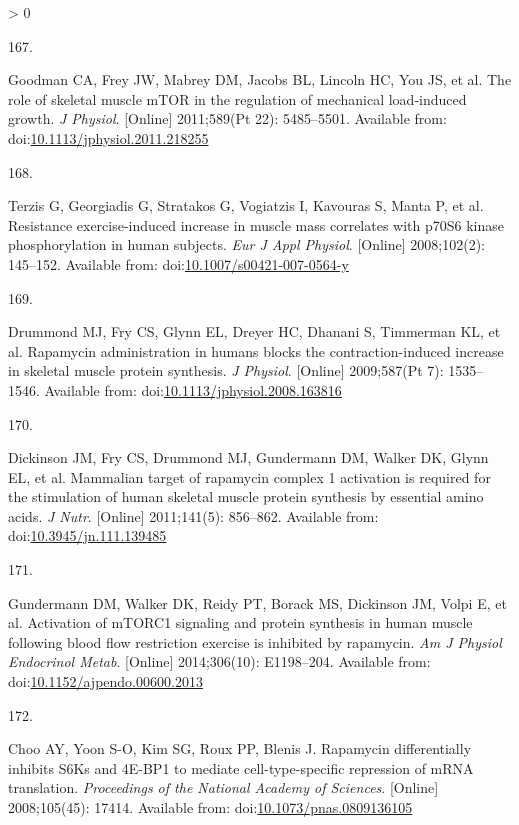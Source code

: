 \documentclass[twoside,10pt]{gihclass} %
\newlength{\cslhangindent}
\newlength{\csllabelwidth}
\newenvironment{CSLReferences}[3] %
 {%
  \setlength{\parindent}{0pt}
  \ifodd #1 \everypar{\setlength{\hangindent}{\cslhangindent}}\ignorespaces\fi
  \ifnum #2 > 0
  \setlength{\parskip}{#2\baselineskip}
  \fi
 }%
 {}
\newcommand{\CSLLeftMargin}[1]{\parbox[t]{\maxof{\widthof{#1}}{\csllabelwidth}}{#1}}
\newcommand{\CSLRightInline}[1]{\parbox[t]{\linewidth}{#1}}
\begin{document}
\begin{CSLReferences}{0}{0}
\leavevmode\hypertarget{ref-RN1072}{}%
\CSLLeftMargin{167. }
\CSLRightInline{Goodman CA, Frey JW, Mabrey DM, Jacobs BL, Lincoln HC, You JS, et al. The role of skeletal muscle mTOR in the regulation of mechanical load-induced growth. \emph{J Physiol}. {[}Online{]} 2011;589(Pt 22): 5485--5501. Available from: doi:\href{https://doi.org/10.1113/jphysiol.2011.218255}{10.1113/jphysiol.2011.218255}}

\leavevmode\hypertarget{ref-RN785}{}%
\CSLLeftMargin{168. }
\CSLRightInline{Terzis G, Georgiadis G, Stratakos G, Vogiatzis I, Kavouras S, Manta P, et al. Resistance exercise-induced increase in muscle mass correlates with p70S6 kinase phosphorylation in human subjects. \emph{Eur J Appl Physiol}. {[}Online{]} 2008;102(2): 145--152. Available from: doi:\href{https://doi.org/10.1007/s00421-007-0564-y}{10.1007/s00421-007-0564-y}}

\leavevmode\hypertarget{ref-RN780}{}%
\CSLLeftMargin{169. }
\CSLRightInline{Drummond MJ, Fry CS, Glynn EL, Dreyer HC, Dhanani S, Timmerman KL, et al. Rapamycin administration in humans blocks the contraction-induced increase in skeletal muscle protein synthesis. \emph{J Physiol}. {[}Online{]} 2009;587(Pt 7): 1535--1546. Available from: doi:\href{https://doi.org/10.1113/jphysiol.2008.163816}{10.1113/jphysiol.2008.163816}}

\leavevmode\hypertarget{ref-RN781}{}%
\CSLLeftMargin{170. }
\CSLRightInline{Dickinson JM, Fry CS, Drummond MJ, Gundermann DM, Walker DK, Glynn EL, et al. Mammalian target of rapamycin complex 1 activation is required for the stimulation of human skeletal muscle protein synthesis by essential amino acids. \emph{J Nutr}. {[}Online{]} 2011;141(5): 856--862. Available from: doi:\href{https://doi.org/10.3945/jn.111.139485}{10.3945/jn.111.139485}}

\leavevmode\hypertarget{ref-RN2826}{}%
\CSLLeftMargin{171. }
\CSLRightInline{Gundermann DM, Walker DK, Reidy PT, Borack MS, Dickinson JM, Volpi E, et al. Activation of mTORC1 signaling and protein synthesis in human muscle following blood flow restriction exercise is inhibited by rapamycin. \emph{Am J Physiol Endocrinol Metab}. {[}Online{]} 2014;306(10): E1198--204. Available from: doi:\href{https://doi.org/10.1152/ajpendo.00600.2013}{10.1152/ajpendo.00600.2013}}

\leavevmode\hypertarget{ref-RN2839}{}%
\CSLLeftMargin{172. }
\CSLRightInline{Choo AY, Yoon S-O, Kim SG, Roux PP, Blenis J. Rapamycin differentially inhibits S6Ks and 4E-BP1 to mediate cell-type-specific repression of mRNA translation. \emph{Proceedings of the National Academy of Sciences}. {[}Online{]} 2008;105(45): 17414. Available from: doi:\href{https://doi.org/10.1073/pnas.0809136105}{10.1073/pnas.0809136105}}


\end{CSLReferences}
\end{document}
